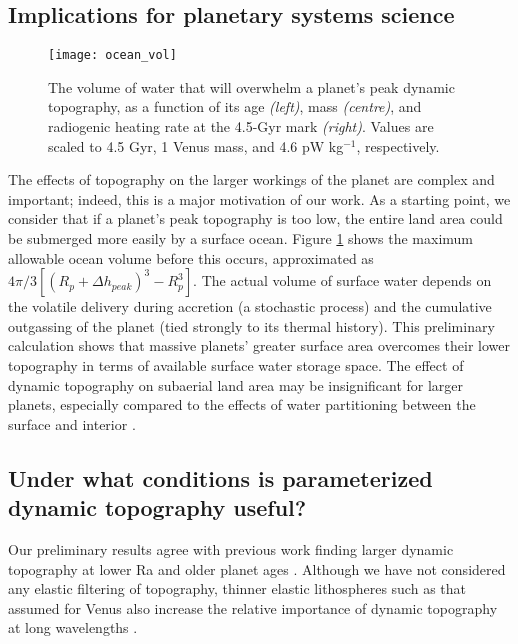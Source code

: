\subsection{Implications for planetary systems science}

\begin{figure}
  \centering
  \texttt{[image: ocean\_vol]}
\caption{The volume of water that will overwhelm a planet's peak dynamic topography, as a function of its age \textit{(left)}, mass \textit{(centre)}, and radiogenic heating rate at the 4.5-Gyr mark \textit{(right)}. Values are scaled to 4.5 Gyr, 1 Venus mass, and 4.6 pW kg$^{-1}$, respectively.}
\label{fig:ocean}
\end{figure}

The effects of topography on the larger workings of the planet are complex and important; indeed, this is a major motivation of our work. As a starting point, we consider that if a planet's peak topography is too low, the entire land area could be submerged more easily by a surface ocean. Figure \ref{fig:ocean} shows the maximum allowable ocean volume before this occurs, approximated as $4\pi/3 \left[(R_p + \Delta h_{peak} )^3 - R_p^3\right]$. The actual volume of surface water depends on the volatile delivery during accretion (a stochastic process) and the cumulative outgassing of the planet (tied strongly to its thermal history). This preliminary calculation shows that massive planets' greater surface area overcomes their lower topography in terms of available surface water storage space. The effect of dynamic topography on subaerial land area may be insignificant for larger planets, especially compared to the effects of water partitioning between the surface and interior \citep{Komacek2016}.



\subsection{Under what conditions is parameterized dynamic topography useful?}

Our preliminary results agree with previous work finding larger dynamic topography at lower Ra and older planet ages \citep{Breuer2015}. Although we have not considered any elastic filtering of topography, thinner elastic lithospheres such as that assumed for Venus also increase the relative importance of dynamic topography at long wavelengths \citep{Golle2012, Dumoulin2013, Breuer2015}.

